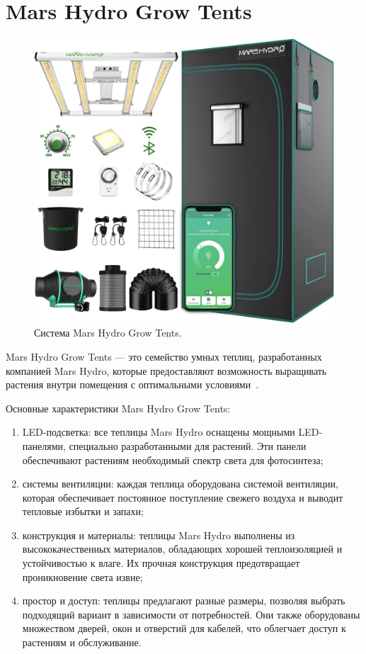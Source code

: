 \section{Mars Hydro Grow Tents}

\begin{figure}
    \centering
    \includegraphics[scale=0.3]{images/MarsHydroGrowTents.png}
    \caption{Система Mars Hydro Grow Tents.}
    \label{fig:MarsHydroGrowTents}
\end{figure}

Mars Hydro Grow Tents --- это семейство умных теплиц, разработанных компанией Mars Hydro, которые предоставляют возможность выращивать растения внутри помещения с оптимальными условиями~\cite{Mars}.

Основные характеристики Mars Hydro Grow Tents:

\begin{enumerate}
    \item LED-подсветка: все теплицы Mars Hydro оснащены мощными LED-панелями, специально разработанными для растений. Эти панели обеспечивают растениям необходимый спектр света для фотосинтеза;
    \item системы вентиляции: каждая теплица оборудована системой вентиляции, которая обеспечивает постоянное поступление свежего воздуха и выводит тепловые избытки и запахи;
    \item конструкция и материалы: теплицы Mars Hydro выполнены из высококачественных материалов, обладающих хорошей теплоизоляцией и устойчивостью к влаге. Их прочная конструкция предотвращает проникновение света извне;
    \item простор и доступ: теплицы предлагают разные размеры, позволяя выбрать подходящий вариант в зависимости от потребностей. Они также оборудованы множеством дверей, окон и отверстий для кабелей, что облегчает доступ к растениям и обслуживание.
\end{enumerate}

